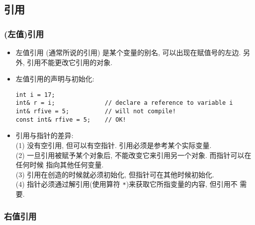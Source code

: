 \documentclass[a4paper,UTF8]{ctexart}
\begin{document}
\subsection{引用}

\subsubsection*{(左值)引用}

\begin{itemize}[leftmargin=0pt, rightmargin=0cm, labelwidth=0.8cm, labelsep=0.2cm]
\item 左值引用 (通常所说的引用) 是某个变量的别名, 可以出现在赋值号的左边. 另外,
  引用不能更改它引用的对象.
\item 左值引用的声明与初始化:
\begin{lstlisting}
int i = 17;
int& r = i;              // declare a reference to variable i
int& rfive = 5;          // will not compile!
const int& rfive = 5;    // OK!
\end{lstlisting}
\item 引用与指针的差异:\\
  (1) 没有空引用, 但可以有空指针. 引用必须是参考某个实际变量.\\
  (2) 一旦引用被赋予某个对象后, 不能改变它来引用另一个对象. 而指针可以在任何时候
  指向其他任何变量.\\
  (3) 引用在创造的时候就必须初始化, 但指针可在其他时候初始化.\\
  (4) 指针必须通过解引用(使用算符 \lstinline{*})来获取它所指变量的内容, 但引用不
  需要.
\end{itemize}

\subsubsection*{右值引用}
\end{document}
